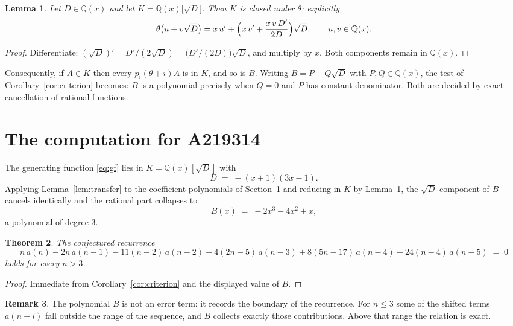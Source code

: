 \documentclass[11pt,a4paper]{article}
\theoremstyle{plain}
\newtheorem{theorem}{Theorem}
\newtheorem{lemma}[theorem]{Lemma}
\theoremstyle{definition}
\newtheorem{remark}[theorem]{Remark}
\begin{document}
\begin{lemma}\label{lem:field}
Let $D\in\mathbb{Q}(x)$ and let $K=\mathbb{Q}(x)\bigl[\sqrt{D}\bigr]$. Then $K$ is closed
under $\theta$; explicitly,
\[
\theta\bigl(u+v\sqrt{D}\bigr)=x\,u'+\Bigl(x\,v'+\frac{x\,v\,D'}{2D}\Bigr)\sqrt{D},
\qquad u,v\in\mathbb{Q}(x).
\]
\end{lemma}

\begin{proof}
Differentiate: $(\sqrt{D})'=D'/(2\sqrt{D})=\bigl(D'/(2D)\bigr)\sqrt{D}$, and multiply by
$x$. Both components remain in $\mathbb{Q}(x)$.
\end{proof}

Consequently, if $A\in K$ then every $p_{i}(\theta+i)A$ is in $K$, and so is $B$. Writing
$B=P+Q\sqrt{D}$ with $P,Q\in\mathbb{Q}(x)$, the test of Corollary~\ref{cor:criterion}
becomes: $B$ is a polynomial precisely when $Q=0$ and $P$ has constant denominator. Both
are decided by exact cancellation of rational functions.

\section{The computation for A219314}

The generating function \eqref{eq:gf} lies in $K=\mathbb{Q}(x)[\sqrt{D}]$ with
\[
D \;=\; - \left(x + 1\right) \left(3 x - 1\right) .
\]
Applying Lemma~\ref{lem:transfer} to the coefficient polynomials of Section~1 and reducing
in $K$ by Lemma~\ref{lem:field}, the $\sqrt{D}$ component of $B$ cancels identically and
the rational part collapses to
\[
B(x)\;=\;- 2 x^{3} - 4 x^{2} + x ,
\]
a polynomial of degree $3$.

\begin{theorem}
The conjectured recurrence
\[
n\,a(n) -  2 n\,a(n-1) -  11 \left(n - 2\right)\,a(n-2) + 4 \left(2 n - 5\right)\,a(n-3) + 8 \left(5 n - 17\right)\,a(n-4) + 24 \left(n - 4\right)\,a(n-5) \;=\;0
\]
holds for every $n>3$.
\end{theorem}

\begin{proof}
Immediate from Corollary~\ref{cor:criterion} and the displayed value of $B$.
\end{proof}

\begin{remark}
The polynomial $B$ is not an error term: it records the boundary of the recurrence. For
$n\le3$ some of the shifted terms $a(n-i)$ fall outside the range of the sequence,
and $B$ collects exactly those contributions. Above that range the relation is exact.
\end{remark}
\end{document}
